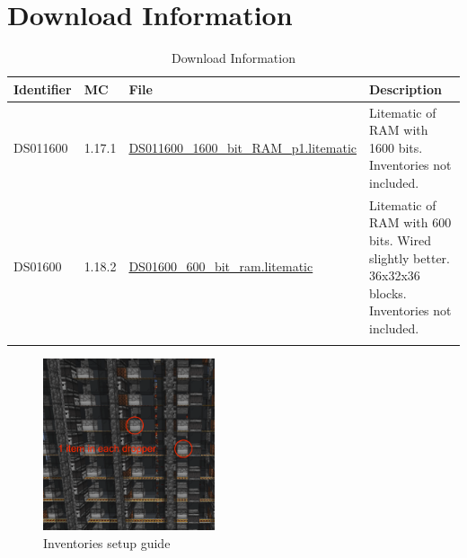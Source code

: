\documentclass[10pt]{datasheet}
\begin{document}
\section{Download Information}
\begin{table}[h]
    \caption{Download Information}
    \begin{tabularx}{\textwidth}{l | l | l | X}
        \thickhline
        \textbf{Identifier} & \textbf{MC} & \textbf{File} & \textbf{Description} \\
        \hline
        DS011600 & 1.17.1 & \href{https://github.com/Soontech-Annals/Archive/blob/b56572c0d2b4f182d9e9d41449d8cb2963b923ae/Archive/data-storage/DS01\%20Streamable\%20Bit\%20RAM/DS011600\_1600\_bit\_RAM\_p1.litematic?raw=1}{DS011600\_1600\_bit\_RAM\_p1.litematic} & Litematic of RAM with 1600 bits. Inventories not included. \\
        \hline
        DS01600 & 1.18.2 & \href{https://github.com/Soontech-Annals/Archive/blob/b56572c0d2b4f182d9e9d41449d8cb2963b923ae/Archive/data-storage/DS01\%20Streamable\%20Bit\%20RAM/DS01600\_600\_bit\_ram.litematic?raw=1}{DS01600\_600\_bit\_ram.litematic} & Litematic of RAM with 600 bits. Wired slightly better. 36x32x36 blocks. Inventories not included. \\
        \thickhline
    \end{tabularx}
\end{table}

\begin{figure}[h]
    \includegraphics[width=0.45\textwidth]{invs.png}
    \caption{Inventories setup guide}
\end{figure}
\end{document}
